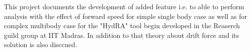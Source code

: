 This project documents the development of added feature i.e. to able to perform analysis 
with the effect of forward speed for simple single body case as well as for complex multibody
case for the "HydRA" tool begin developed in the Reaserch guild group at IIT Madras. In addition to 
that theory about drift force and its solution is also disccued. 